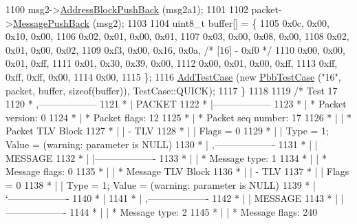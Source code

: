 \begin{DoxyCode}
1100     msg2->\hyperlink{classns3_1_1PbbMessage_a5f623bad2fb1adde7da885e1c92d5311}{AddressBlockPushBack} (msg2a1);
1101 
1102     packet->\hyperlink{classns3_1_1PbbPacket_a4a3170001ef758d9c9c4375b8f089826}{MessagePushBack} (msg2);
1103 
1104     uint8\_t buffer[] = \{
1105       0x0c, 0x00, 0x10, 0x00,
1106       0x02, 0x01, 0x00, 0x01,
1107       0x03, 0x00, 0x08, 0x00,
1108       0x02, 0x01, 0x00, 0x02,
1109       0xf3, 0x00, 0x16, 0x0a,   \textcolor{comment}{/* [16] - 0xf0 */}
1110       0x00, 0x00, 0x01, 0xff,
1111       0x01, 0x30, 0x39, 0x00,
1112       0x00, 0x01, 0x00, 0xff,
1113       0xff, 0xff, 0xff, 0x00,
1114       0x00,
1115     \};
1116     \hyperlink{classns3_1_1TestCase_a3718088e3eefd5d6454569d2e0ddd835}{AddTestCase} (\textcolor{keyword}{new} \hyperlink{classPbbTestCase}{PbbTestCase} (\textcolor{stringliteral}{"16"}, packet, buffer, \textcolor{keyword}{sizeof}(buffer)), 
      TestCase::QUICK);
1117   \}
1118 
1119   \textcolor{comment}{/* Test 17}
1120 \textcolor{comment}{         * ,------------------}
1121 \textcolor{comment}{         * |  PACKET}
1122 \textcolor{comment}{         * |------------------}
1123 \textcolor{comment}{         * | * Packet version:    0}
1124 \textcolor{comment}{         * | * Packet flags:  12}
1125 \textcolor{comment}{         * | * Packet seq number: 17}
1126 \textcolor{comment}{         * |    | * Packet TLV Block}
1127 \textcolor{comment}{         * |    |     - TLV}
1128 \textcolor{comment}{         * |    |         Flags = 0}
1129 \textcolor{comment}{         * |    |         Type = 1; Value = (warning: parameter is NULL)}
1130 \textcolor{comment}{         * |    ,-------------------}
1131 \textcolor{comment}{         * |    |  MESSAGE}
1132 \textcolor{comment}{         * |    |-------------------}
1133 \textcolor{comment}{         * |    | * Message type:       1}
1134 \textcolor{comment}{         * |    | * Message flags:  0}
1135 \textcolor{comment}{         * |    | * Message TLV Block}
1136 \textcolor{comment}{         * |    |     - TLV}
1137 \textcolor{comment}{         * |    |         Flags = 0}
1138 \textcolor{comment}{         * |    |         Type = 1; Value = (warning: parameter is NULL)}
1139 \textcolor{comment}{         * |    `-------------------}
1140 \textcolor{comment}{         * |}
1141 \textcolor{comment}{         * |    ,-------------------}
1142 \textcolor{comment}{         * |    |  MESSAGE}
1143 \textcolor{comment}{         * |    |-------------------}
1144 \textcolor{comment}{         * |    | * Message type:       2}
1145 \textcolor{comment}{         * |    | * Message flags:  240}

\end{DoxyCode}

